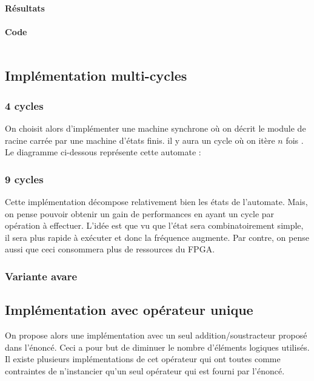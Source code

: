 \documentclass[12pt,a4paper]{article}
\newcommand{\inputvhdl}[1]{\inputminted[linenos,tabsize=2]{vhdl}{./src/#1.vhd}}
\begin{document}
\paragraph{Résultats}
\paragraph{Code}
\inputvhdl{SQRT_one_process}

\subsection{Implémentation multi-cycles}
\subsubsection{4 cycles}
On choisit alors d'implémenter une machine synchrone où on décrit le module de racine carrée par une machine d'états finis. il y aura un cycle où on itère $n$ fois . Le diagramme ci-dessous représente cette automate :
\begin{figure}[H]
\centering

\end{figure}

\subsubsection{9 cycles}
Cette implémentation décompose relativement bien les états de l'automate. Mais, on pense pouvoir obtenir un gain de performances en ayant un cycle par opération à effectuer. L'idée est que vu que l'état sera combinatoirement simple, il sera plus rapide  à exécuter et donc la fréquence augmente. Par contre, on pense aussi que ceci consommera plus de ressources du FPGA.
\begin{figure}[H]
	\centering
	
\end{figure}
\subsubsection{Variante avare} %

%

\subsection{Implémentation avec opérateur unique}
On propose alors une implémentation avec un seul addition/soustracteur proposé dans l'énoncé. Ceci a pour but de diminuer le nombre d'éléments logiques utilisés. Il existe plusieurs implémentations de cet opérateur qui ont toutes comme contraintes de n'instancier qu'un seul opérateur qui est fourni par l'énoncé.
\end{document}
